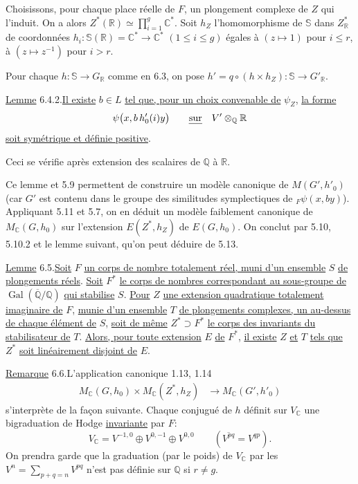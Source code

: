 \documentclass[10pt]{article}
\newcommand{\C}{\mathbb C}
\newcommand{\Q}{\mathbb Q}
\newcommand{\R}{\mathbb R}
\newcommand{\bS}{\mathbb S}
\newcommand{\Gal}{\operatorname{Gal}}
\newcommand{\MC}{M_{\C}}
\begin{document}
Choisissons, pour chaque place réelle de $F$, un plongement complexe de $Z$
qui l'induit. On a alors $\displaystyle Z^*(\R)\simeq\prod_{i=1}^g \C^*$. Soit $h_Z$ l'homomorphisme de $\bS$ dans $Z^*_\R$ de coordonnées $h_i:\bS(\R)=\C^*\longrightarrow\C^*$ $(1\le i\le g)$ égales à $(z\mapsto1)$ pour $i\le r$, à $(z\mapsto z^{-1})$ pour $i>r$.

Pour chaque $h:\bS\to G_\R$ comme en 6.3, on pose $h'=q\circ(h\times h_Z):\bS\longrightarrow G'_\R$.

\noindent \uline{Lemme} 6.4.2.\quad \uline{Il existe} $b\in L$ \uline{tel que, pour un choix convenable de} $\psi_Z$, \uline{la forme}
\[
\psi\bigl(x,b\,h'_0(i)y\bigr)\qquad\text{\uline{sur}}\quad V'\otimes_\Q\R
\]
\uline{soit symétrique et définie positive}.

Ceci se vérifie après extension des scalaires de $\Q$ à $\R$.

Ce lemme et 5.9 permettent de construire un modèle canonique de $M(G',h'_0)$ (car $G'$ est contenu dans le groupe des similitudes symplectiques de ${}_F\psi(x,by)$). Appliquant 5.11 et 5.7, on en déduit un modèle faiblement canonique de $\MC(G,h_0)$ sur l'extension $E(Z^*,h_Z)$ de $E(G,h_0)$. On conclut par 5.10, 5.10.2 et le lemme suivant, qu'on peut déduire de 5.13.

\noindent \uline{Lemme} 6.5.\quad \uline{Soit} $F$ \uline{un corps de nombre totalement réel, muni d'un ensemble} $S$ \uline{de plongements réels}. \uline{Soit} $F^\ast$ \uline{le corps de nombres correspondant au sous-groupe de} $\Gal(\overline{\Q}/\Q)$ \uline{qui stabilise} $S$. \uline{Pour} $Z$ \uline{une extension quadratique totalement imaginaire de} $F$, \uline{munie d'un ensemble} $T$ \uline{de plongements complexes, un au-dessus de chaque élément de} $S$, \uline{soit de même} $Z^\ast\supset F^\ast$ \uline{le corps des invariants du stabilisateur de} $T$. \uline{Alors, pour toute extension} $E$ \uline{de} $F^\ast$, \uline{il existe} $Z$ \uline{et} $T$ \uline{tels que} $Z^\ast$ \uline{soit linéairement disjoint de} $E$.

\noindent \uline{Remarque} 6.6.\quad L'application canonique 1.13, 1.14
\begingroup
\makeatletter
\tagsleft@true
\makeatother
\begin{align}
\MC(G,h_0)\times\MC(Z^*,h_Z)&\longrightarrow\MC(G',h'_0) \tag{6.6.1}
\end{align}
\endgroup
s'interprète de la façon suivante. Chaque conjugué de $h$ définit sur $V_{\C}$ une
bigraduation de Hodge \uline{invariante} par $F$:
\[
V_{\C}=V^{-1,0}\oplus V^{0,-1}\oplus V^{0,0}
\qquad(\overline{V^{pq}}=V^{qp}).
\]
On prendra garde que la graduation (par le poids) de $V_{\C}$ par les
$\displaystyle V^n=\sum_{p+q=n}V^{pq}$ n'est pas définie sur $\Q$ si $r\ne g$.
\end{document}
